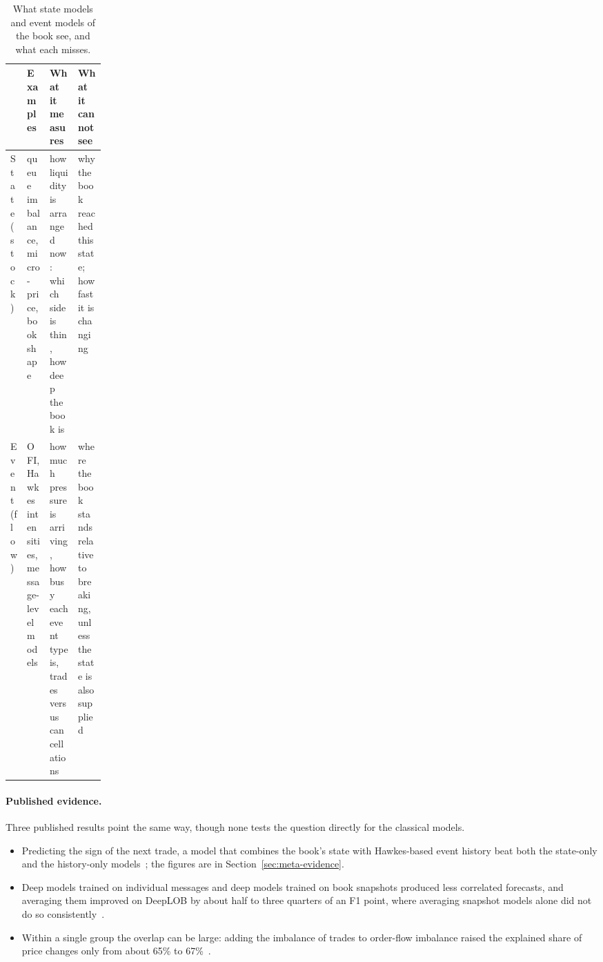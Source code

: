 \begin{table}[!htbp]
\centering\footnotesize
\caption{What state models and event models of the book see, and what each misses.}
\label{tab:state-event}
\setlength{\tabcolsep}{3pt}
\begin{tabularx}{\linewidth}{>{\raggedright\arraybackslash}p{0.16\linewidth}>{\raggedright\arraybackslash}X>{\raggedright\arraybackslash}X>{\raggedright\arraybackslash}X}
\toprule
& Examples & What it measures & What it cannot see \\
\midrule
State (stock) & queue imbalance, micro-price, book shape & how liquidity is arranged now: which side is thin, how deep the book is & why the book reached this state; how fast it is changing \\
Event (flow) & OFI, Hawkes intensities, message-level models & how much pressure is arriving, how busy each event type is, trades versus cancellations & where the book stands relative to breaking, unless the state is also supplied \\
\bottomrule
\end{tabularx}
\end{table}

\paragraph{Published evidence.} Three published results point the same way, though none tests the question
directly for the classical models.
\begin{itemize}[leftmargin=1.5em,itemsep=2pt]
\item Predicting the sign of the next trade, a model that combines the book's state with Hawkes-based
  event history beat both the state-only and the history-only models~\citep{munitoke2020ratio}; the
  figures are in Section~\ref{sec:meta-evidence}.
\item Deep models trained on individual messages and deep models trained on book snapshots produced less
  correlated forecasts, and averaging them improved on DeepLOB by about half to three quarters of an F1
  point, where averaging snapshot models alone did not do so consistently~\citep{zhanglimzohren2021mbo}.
\item Within a single group the overlap can be large: adding the imbalance of trades to order-flow
  imbalance raised the explained share of price changes only from about 65\% to 67\%~\citep{cks2014}.
\end{itemize}


